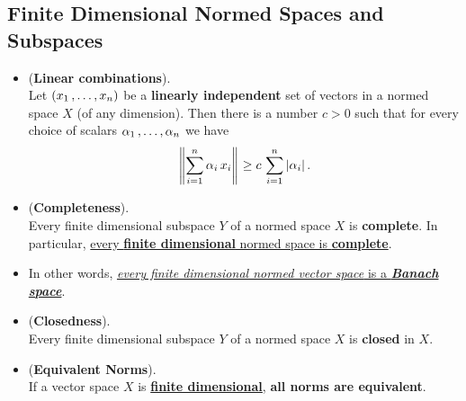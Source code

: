 \documentclass[11pt]{article}
\begin{document}
\subsection{Finite Dimensional Normed Spaces and Subspaces}
\begin{itemize}
\item \begin{lemma} (\textbf{Linear combinations}). \citep{kreyszig1989introductory} \\
Let $(x_1 \,{,}\ldots{,}\, x_n)$ be a \textbf{linearly independent} set of vectors in a normed space $X$ (of any dimension).
Then there is a number $c > 0$ such that for every choice of scalars $\alpha_1 \,{,}\ldots{,}\, \alpha_n$ we have
\begin{align}
\left\|\sum_{i=1}^{n}\alpha_i\,x_i\right\|_{} \ge c\,\sum_{i=1}^{n}\left\lvert \alpha_i \right\rvert.\label{eqn: linear_combination_greater_than_coefficient}
\end{align}
\end{lemma}

\item \begin{theorem} (\textbf{Completeness}). \citep{kreyszig1989introductory} \\
Every finite dimensional subspace $Y$ of a normed space $X$ is \textbf{complete}. In particular, \underline{every \textbf{finite dimensional} normed space is \textbf{complete}}.
\end{theorem}

\item \begin{remark}
In other words, \underline{\emph{every finite dimensional normed vector space} is a \emph{\textbf{Banach space}}}.
\end{remark}

\item \begin{proposition} (\textbf{Closedness}).  \citep{kreyszig1989introductory}\\
Every finite dimensional subspace $Y$ of a normed space $X$ is \textbf{closed} in $X$.
\end{proposition}

\item \begin{theorem} (\textbf{Equivalent Norms}). \citep{kreyszig1989introductory}\\
If a vector space $X$ is \underline{\textbf{finite dimensional}}, \textbf{all norms are equivalent}.
\end{theorem}



\end{itemize}
\end{document}
